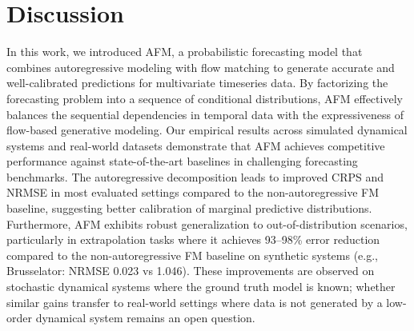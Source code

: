 \documentclass[preprint,12pt,authoryear]{elsarticle}
\newcommand{\oldrev}[1]{#1}
\begin{document}
\section{Discussion}
In this work, we introduced AFM, a probabilistic forecasting model that combines autoregressive modeling with flow matching to generate accurate and well-calibrated predictions for multivariate timeseries data. By factorizing the forecasting problem into a sequence of conditional distributions, AFM effectively balances the sequential dependencies in temporal data with the expressiveness of flow-based generative modeling.
Our empirical results across simulated dynamical systems and real-world datasets demonstrate that AFM achieves competitive performance against state-of-the-art baselines in challenging forecasting benchmarks. \oldrev{The autoregressive decomposition leads to improved CRPS and NRMSE in most evaluated settings compared to the non-autoregressive FM baseline, suggesting better calibration of marginal predictive distributions.} Furthermore, AFM exhibits robust generalization to out-of-distribution scenarios, particularly in extrapolation tasks where it achieves 93--98\% error reduction compared to the non-autoregressive FM baseline on synthetic systems \oldrev{(e.g., Brusselator: NRMSE 0.023 vs 1.046). These improvements are observed on stochastic dynamical systems where the ground truth model is known; whether similar gains transfer to real-world settings where data is not generated by a low-order dynamical system remains an open question.}
\end{document}
